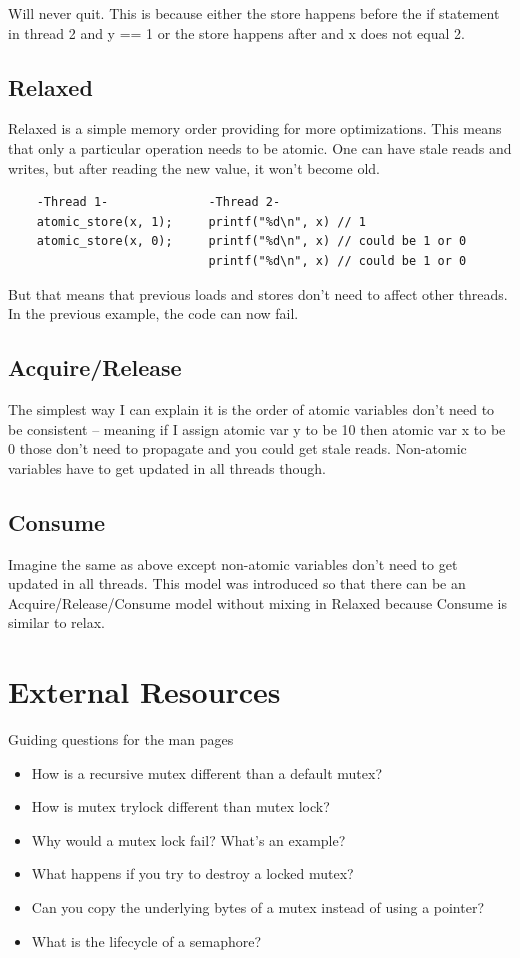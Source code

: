 Will never quit.
This is because either the store happens before the if statement in thread 2 and y == 1 or the store happens after and x does not equal 2.

\subsection{Relaxed}

Relaxed is a simple memory order providing for more optimizations.
This means that only a particular operation needs to be atomic.
One can have stale reads and writes, but after reading the new value, it won't become old.

\begin{verbatim}
    -Thread 1-              -Thread 2-
    atomic_store(x, 1);     printf("%d\n", x) // 1
    atomic_store(x, 0);     printf("%d\n", x) // could be 1 or 0
                            printf("%d\n", x) // could be 1 or 0
\end{verbatim}

But that means that previous loads and stores don't need to affect other threads.
In the previous example, the code can now fail.

\subsection{Acquire/Release}

The simplest way I can explain it is the order of atomic variables don't need to be consistent -- meaning if I assign atomic var y to be 10 then atomic var x to be 0 those don't need to propagate and you could get stale reads.
Non-atomic variables have to get updated in all threads though.

\subsection{Consume}

Imagine the same as above except non-atomic variables don't need to get updated in all threads.
This model was introduced so that there can be an Acquire/Release/Consume model without mixing in Relaxed because Consume is similar to relax.

\section{External Resources}

Guiding questions for the man pages

\begin{itemize}
\item How is a recursive mutex different than a default mutex?
\item How is mutex trylock different than mutex lock?
\item Why would a mutex lock fail? What's an example?
\item What happens if you try to destroy a locked mutex?
\item Can you copy the underlying bytes of a mutex instead of using a pointer?
\item What is the lifecycle of a semaphore?
\end{itemize}


